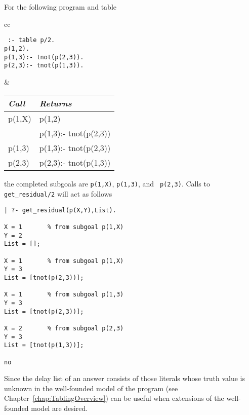 \begin{description}
\begin{example}
For the following program and table
     \begin{center}
     \begin{tabular}{cc}
     \begin{minipage}{2.1in}
     {\tt
          :- table p/2. \\
          p(1,2). \\
          p(1,3):- tnot(p(2,3)). \\
          p(2,3):- tnot(p(1,3)). 
     }
     \end{minipage}
     &
     \begin{tabular}{||l|l||}   \hline
     {\em Call}                 & {\em Returns} \\ \hline \hline
     p(1,X)                     & p(1,2) \\ 
                                & p(1,3):- tnot(p(2,3)) \\ \hline
     p(1,3)                     & p(1,3):- tnot(p(2,3)) \\ \hline
     p(2,3)                     & p(2,3):- tnot(p(1,3)) \\ \hline
     \end{tabular}
     \end{tabular}
     \end{center}
the completed subgoals are {\tt p(1,X)}, {\tt p(1,3)}, and {\tt
p(2,3)}.  Calls to {\tt get\_residual/2} will act as follows
%
\begin{center}
\begin{small}
\begin{minipage}{2.5in}
\begin{verbatim} 
| ?- get_residual(p(X,Y),List).

X = 1       % from subgoal p(1,X)
Y = 2
List = [];

X = 1       % from subgoal p(1,X)
Y = 3
List = [tnot(p(2,3))];

X = 1       % from subgoal p(1,3)
Y = 3
List = [tnot(p(2,3))];

X = 2       % from subgoal p(2,3)
Y = 3
List = [tnot(p(1,3))];

no
\end{verbatim}
\end{minipage}
\end{small}
\end{center}
\end{example}

Since the delay list of an answer consists of those literals whose
truth value is unknown in the well-founded model of the program (see
Chapter~\ref{chap:TablingOverview})  can be
useful when extensions of the well-founded model are desired.


\end{description}
